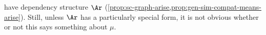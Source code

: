 have dependency structure $\Ar$
(\cref{prop:sc-graph-arise,prop:gen-sim-compat-means-arise}).
Still,
unless $\Ar$ has a particularly special form, 
it is not obvious 
whether or not
this says something about $\mu$.
